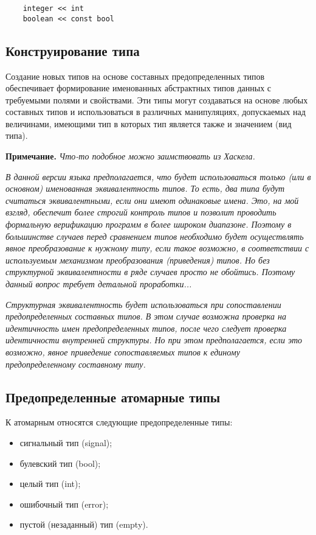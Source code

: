 {\begin{verbatim}
    integer << int
    boolean << const bool
\end{verbatim}

\subsection{Конструирование типа}

Создание новых типов на основе составных предопределенных типов обеспечивает формирование именованных абстрактных типов данных с требуемыми полями и свойствами. Эти типы могут создаваться на основе любых составных типов и использоваться в различных манипуляциях, допускаемых над величинами, имеющими тип в которых тип является также и значением (вид типа).

\textbf{Примечание.}
\textit{Что-то подобное можно заимствовать из Хаскела.}

\textit{В данной версии языка предполагается, что будет использоваться только (или в основном) именованная эквивалентность типов. То есть, два типа будут считаться эквивалентными, если они имеют одинаковые имена. Это, на мой взгляд, обеспечит более строгий контроль типов и позволит проводить формальную верификацию программ в более широком диапазоне. Поэтому в большинстве случаев перед сравнением типов необходимо будет осуществлять явное преобразование к нужному типу, если такое возможно, в соответствии с используемым механизмом преобразования (приведения) типов. Но без структурной эквивалентности в ряде случаев просто не обойтись. Поэтому данный вопрос требует детальной проработки...}

\textit{Структурная эквивалентность будет использоваться при сопоставлении предопределенных составных типов. В этом случае возможна проверка на идентичность имен предопределенных типов, после чего следует проверка идентичности внутренней структуры. Но при этом предполагается, если это возможно, явное приведение сопоставляемых типов к единому предопределенному составному типу.}

\subsection{Предопределенные атомарные типы}

К атомарным относятся следующие предопределенные типы:

\begin{itemize}
	\item сигнальный тип (signal);
	\item булевский тип (bool);
	\item целый тип (int);
	\item ошибочный тип (error);
	\item пустой (незаданный) тип (empty).
\end{itemize}

}
